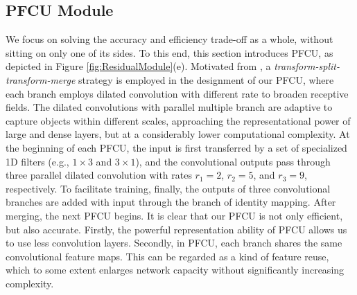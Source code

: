 \documentclass[runningheads]{llncs}
\begin{document}
\subsection{PFCU Module}\label{sec:PFCU}

We focus on solving the accuracy and efficiency trade-off as a whole, without sitting on only one of its sides. To this end, this section introduces PFCU, as depicted in  Figure \ref{fig:ResidualModule}(e). Motivated from \cite{Rastegari2016xnor,Szegedy2016rethinking}, a \emph{transform-split-transform-merge} strategy is employed in the designment of our PFCU, where each branch employs dilated convolution with different rate to broaden receptive fields. The dilated convolutions with parallel multiple branch are adaptive to capture objects within different scales, approaching the representational power of large and dense layers, but at a considerably lower computational complexity. At the beginning of each PFCU, the input is first transferred by a set of specialized 1D filters (e.g., $1 \times 3$ and $3 \times 1$), and the convolutional outputs pass through three parallel dilated convolution with rates $r_1 = 2$, $r_2 = 5$, and $r_3 = 9$, respectively. To facilitate training, finally, the outputs of three convolutional branches are added with input through the branch of identity mapping. After merging, the next PFCU begins. It is clear that our PFCU is not only efficient, but also accurate. Firstly, the powerful representation ability of PFCU allows us to use less convolution layers. Secondly, in PFCU, each branch shares the same convolutional feature maps. This can be regarded as a kind of feature reuse, which to some extent enlarges network capacity without significantly increasing complexity.
\end{document}
